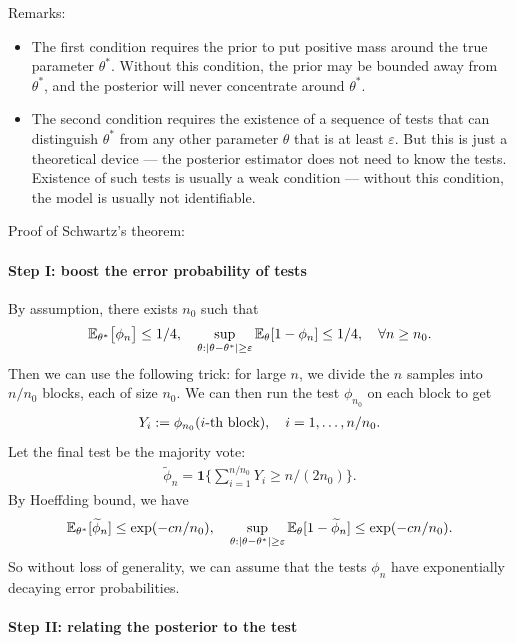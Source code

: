 \documentclass[11pt,letterpaper]{article}
\numberwithin{theorem}{lecture}
\numberwithin{proposition}{lecture}
\numberwithin{lemma}{lecture}
\numberwithin{claim}{lecture}
\numberwithin{corollary}{lecture}
\numberwithin{definition}{lecture}
\numberwithin{conjecture}{lecture}
\numberwithin{remark}{lecture}
\numberwithin{example}{lecture}
\numberwithin{equation}{lecture}
\begin{document}
Remarks:
\begin{itemize}
  \item The first condition requires the prior to put positive mass around the true parameter $\theta^*$. Without this condition, the prior may be bounded away from $\theta^*$, and the posterior will never concentrate around $\theta^*$.
  \item The second condition requires the existence of a sequence of tests that can distinguish $\theta^*$ from any other parameter $\theta$ that is at least $\varepsilon$. But this is just a theoretical device --- the posterior estimator does not need to know the tests. Existence of such tests is usually a weak condition --- without this condition, the model is usually not identifiable.
\end{itemize}
Proof of Schwartz's theorem:

\paragraph{Step I: boost the error probability of tests}
By assumption, there exists $n_0$ such that
\begin{align*}
  {\mathbb{E}}_{{\theta^*}} \big[ \phi_n \big] \leq 1/4, \quad \sup_{\theta: |\theta - {\theta^*}| \geq \varepsilon} {\mathbb{E}}_\theta [1 - \phi_n] \leq 1/4, \quad \forall n \geq n_0.
\end{align*}
Then we can use the following trick: for large $n$, we divide the $n$ samples into $n/ n_0$ blocks, each of size $n_0$. We can then run the test $\phi_{n_0}$ on each block to get
\begin{align*}
Y_i := \phi_{n_0} (\mbox{$i$-th block}), \quad i = 1, \ldots, n / n_0.
\end{align*}
Let the final test be the majority vote:
\begin{align*}
  \widetilde{\phi}_n = \bm{1} \Big\{ \sum_{i = 1}^{n / n_0} Y_i \geq n / (2 n_0) \Big\}.
\end{align*}
By Hoeffding bound, we have
\begin{align*}
  {\mathbb{E}}_{{\theta^*}} [\widetilde{\phi}_n] \leq \exp (- c n / n_0), \quad \sup_{\theta: |\theta - {\theta^*}| \geq \varepsilon} {\mathbb{E}}_\theta [1 - \widetilde{\phi}_n] \leq \exp (- c n / n_0).
\end{align*}
So without loss of generality, we can assume that the tests $\phi_n$ have exponentially decaying error probabilities.

\paragraph{Step II: relating the posterior to the test}
\end{document}
